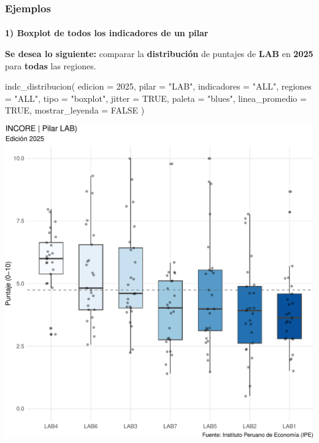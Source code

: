 \documentclass[
  11pt,
  letterpaper,
  DIV=11,
  numbers=noendperiod]{scrartcl}
\makeatletter
\let\oldparagraph\paragraph
\renewcommand{\paragraph}{
    \@ifstar
      \xxxParagraphStar
      \xxxParagraphNoStar
  }
\newcommand{\xxxParagraphStar}[1]{\oldparagraph*{#1}\mbox{}}
\newcommand{\xxxParagraphNoStar}[1]{\oldparagraph{#1}\mbox{}}
\newenvironment{Shaded}{\begin{snugshade}}{\end{snugshade}}
\newcommand{\AttributeTok}[1]{\textcolor[rgb]{0.40,0.45,0.13}{#1}}
\newcommand{\ConstantTok}[1]{\textcolor[rgb]{0.56,0.35,0.01}{#1}}
\newcommand{\DecValTok}[1]{\textcolor[rgb]{0.68,0.00,0.00}{#1}}
\newcommand{\FunctionTok}[1]{\textcolor[rgb]{0.28,0.35,0.67}{#1}}
\newcommand{\NormalTok}[1]{\textcolor[rgb]{0.00,0.23,0.31}{#1}}
\newcommand{\StringTok}[1]{\textcolor[rgb]{0.13,0.47,0.30}{#1}}
\makeatother
\begin{document}
\subsubsection{\texorpdfstring{\textbf{Ejemplos}}{Ejemplos}}\label{ejemplos-17}

\paragraph{\texorpdfstring{\textbf{1) Boxplot de todos los indicadores
de un
pilar}}{1) Boxplot de todos los indicadores de un pilar}}\label{boxplot-de-todos-los-indicadores-de-un-pilar-1}

\textbf{Se desea lo siguiente:} comparar la \textbf{distribución} de
puntajes de \textbf{LAB} en \textbf{2025} para \textbf{todas} las
regiones.

\begin{Shaded}
\begin{Highlighting}[]
\FunctionTok{indc\_distribucion}\NormalTok{(}
  \AttributeTok{edicion         =} \DecValTok{2025}\NormalTok{,}
  \AttributeTok{pilar           =} \StringTok{"LAB"}\NormalTok{,}
  \AttributeTok{indicadores     =} \StringTok{"ALL"}\NormalTok{,}
  \AttributeTok{regiones        =} \StringTok{"ALL"}\NormalTok{,}
  \AttributeTok{tipo            =} \StringTok{"boxplot"}\NormalTok{,}
  \AttributeTok{jitter          =} \ConstantTok{TRUE}\NormalTok{,}
  \AttributeTok{paleta          =} \StringTok{"blues"}\NormalTok{,}
  \AttributeTok{linea\_promedio  =} \ConstantTok{TRUE}\NormalTok{,}
  \AttributeTok{mostrar\_leyenda =} \ConstantTok{FALSE}
\NormalTok{)}
\end{Highlighting}
\end{Shaded}

\includegraphics{Manual_files/figure-pdf/unnamed-chunk-97-1.pdf}
\end{document}
